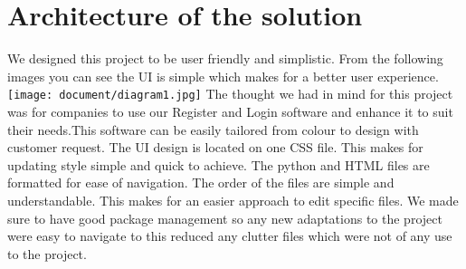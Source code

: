\documentclass{article}
\begin{document}
\maketitle
\section{Architecture of the solution }
We designed this project to be user friendly and simplistic. From the following images you can see the UI is simple which makes for a better user experience.
\texttt{[image: document/diagram1.jpg]}
The thought we had in mind for this project was for companies to use our Register and Login software and enhance it to suit their needs.This software can be easily tailored from colour to design with customer request.
The UI design is located on one CSS file. This makes for updating style simple and quick to achieve.
The python and HTML files are formatted for ease of navigation. The order of the files are simple and understandable. This makes for an easier approach to edit specific files. We made sure to have good package management so any new adaptations to the project were easy to navigate to this reduced any clutter files which were not of any use to the project.
\end{document}
